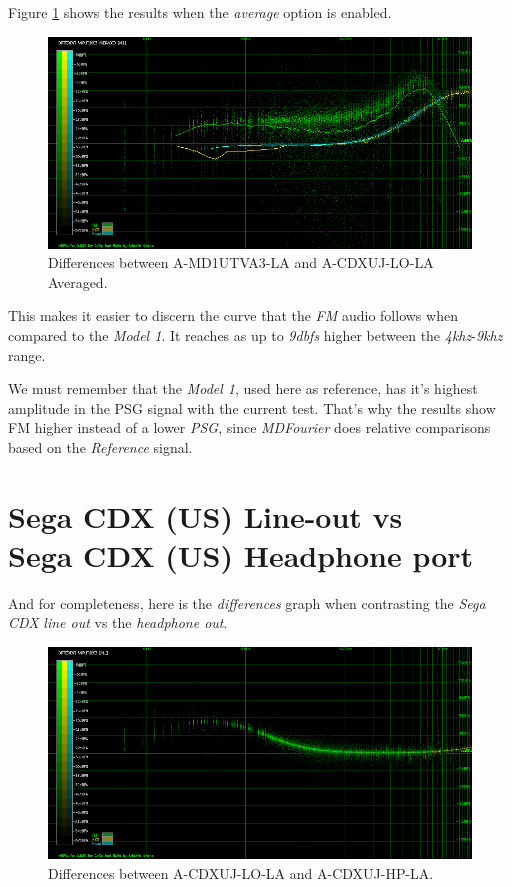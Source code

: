 \documentclass[10pt,a4paper]{report}
\newcommand{\khz}[1]{\textit{#1\acrshort{khz}}}
\newcommand{\db}[1]{\textit{#1\acrshort{dbfs}}}
\begin{document}
Figure \ref{fig:A-MD1UTVA3-LA_vs_A-CDXUJ-LO-LA_AVG} shows the results when the \textit{average} option is enabled.

\begin{figure}[H]
	\centering
	\includegraphics[width=1.0\linewidth]{images/results/8-A-MD1UTVA3-LA_vs_A-CDXUJ-LO-LA-avg.png}
	\caption[A-MD1UTVA3-LA vs A-CDXUJ-LO-LA AVG]{Differences between A-MD1UTVA3-LA and A-CDXUJ-LO-LA Averaged.}
	\label{fig:A-MD1UTVA3-LA_vs_A-CDXUJ-LO-LA_AVG}
\end{figure}

This makes it easier to discern the curve that the \textit{FM} audio follows when compared to the \textit{Model 1}. It reaches as up to \db{9} higher between the \khz{4}-\khz{9} range.

We must remember that the \textit{Model 1}, used here as reference, has it's highest amplitude in the PSG signal with the current test. That's why the results show FM higher instead of a lower \textit{PSG}, since \textit{MDFourier} does relative comparisons based on the \textit{Reference} signal.

\section{Sega CDX (US) Line-out vs\\ Sega CDX (US) Headphone port}

And for completeness, here is the \textit{differences} graph when contrasting the \textit{Sega CDX} \textit{line out} vs the \textit{headphone out}.

\begin{figure}[H]
	\centering
	\includegraphics[width=1.0\linewidth]{images/results/9-A-CDXUJ-LO-LA_vs_A-CDXUJ-HP-LA.png}
	\caption[A-CDXUJ-LO-LA vs A-CDXUJ-HP-LA]{Differences between A-CDXUJ-LO-LA and A-CDXUJ-HP-LA.}
	\label{fig:A-CDXUJ-LO-LA_vs_A-CDXUJ-HP-LA}
\end{figure}
\end{document}
